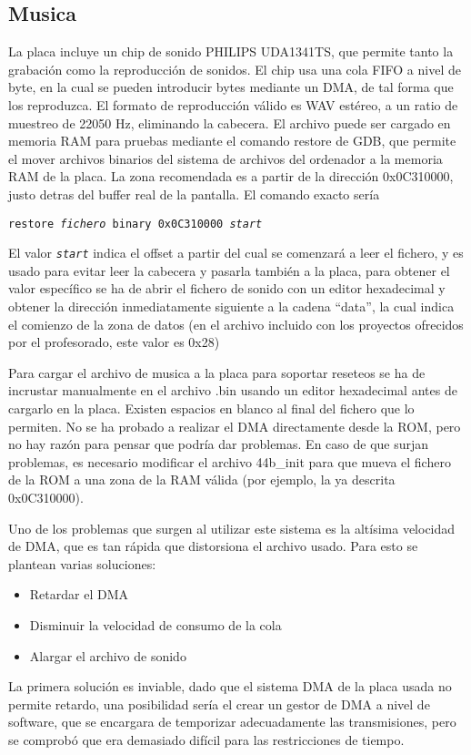\documentclass[12pt,letterpaper]{article}
\begin{document}
\subsection{Musica}
\label{subsec:musica}
La placa incluye un chip de sonido PHILIPS UDA1341TS, que permite
tanto la grabación como la reproducción de sonidos. El chip usa una
cola FIFO a nivel de byte, en la cual se pueden introducir bytes
mediante un DMA, de tal forma que los reproduzca. El formato de
reproducción válido es WAV estéreo, a un ratio de muestreo de 22050
Hz, eliminando la cabecera. El archivo puede ser cargado en memoria
RAM para pruebas mediante el comando restore de GDB, que permite el
mover archivos binarios del sistema de archivos del ordenador a la
memoria RAM de la placa. La zona recomendada es a partir de la
dirección 0x0C310000, justo detras del buffer real de la pantalla. El
comando exacto sería

\texttt{restore \textit{fichero} binary 0x0C310000 \textit{start}} 

El valor \texttt{\textit{start}} indica el offset a partir del cual se
comenzará a leer el fichero, y es usado para evitar leer la cabecera y
pasarla también a la placa, para obtener el valor específico se ha de
abrir el fichero de sonido con un editor hexadecimal y obtener la
dirección inmediatamente siguiente a la cadena ``data'', la cual
indica el comienzo de la zona de datos (en el archivo incluido con los
proyectos ofrecidos por el profesorado, este valor es 0x28)

Para cargar el archivo de musica a la placa para soportar reseteos se
ha de incrustar manualmente en el archivo .bin usando un editor
hexadecimal antes de cargarlo en la placa. Existen espacios en blanco
al final del fichero que lo permiten. No se ha probado a realizar el
DMA directamente desde la ROM, pero no hay razón para pensar que
podría dar problemas. En caso de que surjan problemas, es necesario
modificar el archivo 44b\_init para que mueva el fichero de la ROM a
una zona de la RAM válida (por ejemplo, la ya descrita 0x0C310000).

Uno de los problemas que surgen al utilizar este sistema es la
altísima velocidad de DMA, que es tan rápida que distorsiona el
archivo usado. Para esto se plantean varias soluciones:
\begin{itemize}
  \item Retardar el DMA
  \item Disminuir la velocidad de consumo de la cola
  \item Alargar el archivo de sonido
\end{itemize}
La primera solución es inviable, dado que el sistema DMA de la placa
usada no permite retardo, una posibilidad sería el crear un gestor de
DMA a nivel de software, que se encargara de temporizar adecuadamente
las transmisiones, pero se comprobó que era demasiado difícil para las
restricciones de tiempo.
\end{document}
